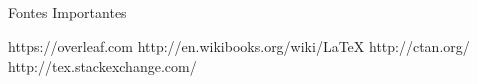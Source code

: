 \subsection{}
\begin{frame}{Fontes Importantes}
  \begin{thebibliography}{10}
  \beamertemplatearticlebibitems
    https://overleaf.com
    \newblock \href{https://overleaf.com}{}
    http://en.wikibooks.org/wiki/LaTeX
    \newblock \href{http://en.wikibooks.org/wiki/LaTeX}{}
    http://ctan.org/
    \newblock \href{http://ctan.org/}{}
    http://tex.stackexchange.com/
    \newblock \href{http://tex.stackexchange.com/}{}
  \end{thebibliography}
\end{frame}

% 